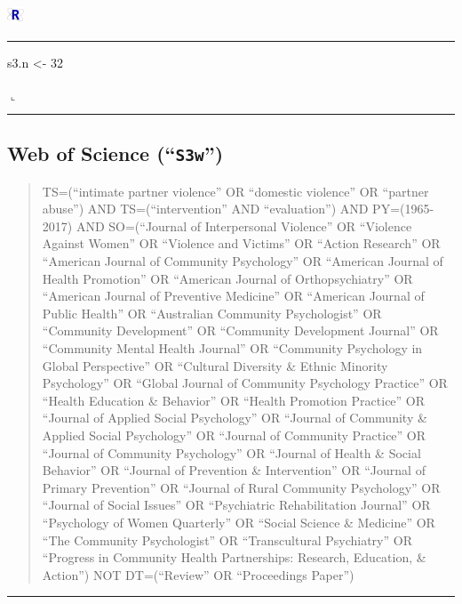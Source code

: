 \documentclass[]{tufte-handout}
\newenvironment{Shaded}{}{}
\newcommand{\DecValTok}[1]{{#1}}
\newcommand{\StringTok}[1]{{#1}}
\newcommand{\NormalTok}[1]{{#1}}
\newcommand{\Rrule}{
    \vspace*{1em}
    \noindent
    \hspace{-1em}
    \includegraphics[width=0.5cm]{auxDocs/Rlogo.png}
    \textcolor{Rblue}{
        \rule[0.1in]{0.90\linewidth}{0.02mm}
    }
    \vspace{-1.35em}
}
\newcommand{\Rerule}{
    \noindent
    \hspace{-1em}
    \textcolor{Rblue}{
        $\llcorner$\rule[-0.4mm]{\linewidth}{0.02mm}
    }
}
\begin{document}
\Rrule

\begin{Shaded}
\begin{Highlighting}[]
\NormalTok{s3.n <-}\StringTok{ }\DecValTok{32}
\end{Highlighting}
\end{Shaded}

\Rerule

\subsection{\texorpdfstring{Web of Science
(``\texttt{S3w}'')}{Web of Science (S3w)}}\label{web-of-science-s3w}

\begin{quote}
TS=(``intimate partner violence'' OR ``domestic violence'' OR ``partner
abuse'') AND TS=(``intervention'' AND ``evaluation'') AND PY=(1965-2017)
AND SO=(``Journal of Interpersonal Violence'' OR ``Violence Against
Women'' OR ``Violence and Victims'' OR ``Action Research'' OR ``American
Journal of Community Psychology'' OR ``American Journal of Health
Promotion'' OR ``American Journal of Orthopsychiatry'' OR ``American
Journal of Preventive Medicine'' OR ``American Journal of Public
Health'' OR ``Australian Community Psychologist'' OR ``Community
Development'' OR ``Community Development Journal'' OR ``Community Mental
Health Journal'' OR ``Community Psychology in Global Perspective'' OR
``Cultural Diversity \& Ethnic Minority Psychology'' OR ``Global Journal
of Community Psychology Practice'' OR ``Health Education \& Behavior''
OR ``Health Promotion Practice'' OR ``Journal of Applied Social
Psychology'' OR ``Journal of Community \& Applied Social Psychology'' OR
``Journal of Community Practice'' OR ``Journal of Community Psychology''
OR ``Journal of Health \& Social Behavior'' OR ``Journal of Prevention
\& Intervention'' OR ``Journal of Primary Prevention'' OR ``Journal of
Rural Community Psychology'' OR ``Journal of Social Issues'' OR
``Psychiatric Rehabilitation Journal'' OR ``Psychology of Women
Quarterly'' OR ``Social Science \& Medicine'' OR ``The Community
Psychologist'' OR ``Transcultural Psychiatry'' OR ``Progress in
Community Health Partnerships: Research, Education, \& Action'') NOT
DT=(``Review'' OR ``Proceedings Paper'')
\end{quote}

\begin{center}\rule{0.5\linewidth}{\linethickness}\end{center}
\end{document}
